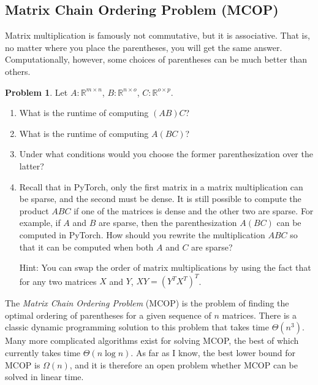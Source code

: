\documentclass[10pt]{article}
\theoremstyle{definition}
\newtheorem{problem}{Problem}
\newcommand{\R}{\mathbb R}
\newcommand{\trans}[1]{{#1}^{T}}
\begin{document}

\subsection{Matrix Chain Ordering Problem (MCOP)}

Matrix multiplication is famously not commutative, but it is associative.
That is, no matter where you place the parentheses,
you will get the same answer.
Computationally, however, some choices of parentheses can be much better than others.

\begin{problem}
    Let $A : \R^{m\times n}$, $B : \R^{n\times o}$, $C : \R^{o\times p}$.

    \begin{enumerate}
        \item What is the runtime of computing $(AB)C$?
            \vspace{2in}
        \item What is the runtime of computing $A(BC)$?
            \vspace{2in}
        \item Under what conditions would you choose the former parenthesization over the latter?
            \vspace{2in}
        \newpage
        \item
            Recall that in PyTorch, only the first matrix in a matrix multiplication can be sparse,
            and the second must be dense.
            It is still possible to compute the product $ABC$ if one of the matrices is dense and the other two are sparse.
            For example, if $A$ and $B$ are sparse, then the parenthesization $A(BC)$ can be computed in PyTorch.
            How should you rewrite the multiplication $ABC$ so that it can be computed when both $A$ and $C$ are sparse?

            \noindent
            Hint: You can swap the order of matrix multiplications by using the fact that for any two matrices $X$ and $Y$, $XY = \trans{(\trans Y \trans X)}$.
            \vspace{2in}
    \end{enumerate}
\end{problem}

The \emph{Matrix Chain Ordering Problem} (MCOP) is the problem of finding the optimal ordering of parentheses for a given sequence of $n$ matrices.
There is a classic dynamic programming solution to this problem that takes time $\Theta(n^3)$.
Many more complicated algorithms exist for solving MCOP,
the best of which currently takes time $\Theta(n \log n)$.
As far as I know, the best lower bound for MCOP is $\Omega(n)$,
and it is therefore an open problem whether MCOP can be solved in linear time.
\end{document}
